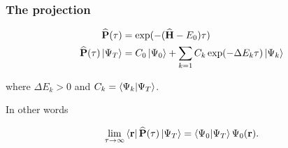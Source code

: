 \begin{frame}
\frametitle{The projection}
  \begin{align*}
  {\bf\widehat{P}}(\tau) &= \exp(-({\bf\widehat{H}} - E_0)\tau) \\
  {\bf\widehat{P}}(\tau)\left| \Psi_T \right> &= C_0\left| \Psi_0 \right> + \sum_{k=1} C_k\exp(-\Delta E_k\tau) \left| \Psi_k \right>
  \end{align*}

  where $\Delta E_k > 0$ and $C_k = \left\langle \Psi_k | \Psi_T\right\rangle$. 
  
  \pause 
  
   In other words
 
 \begin{equation*}
  \lim_{\tau\to\infty}\left< \mathbf{r} \right|{\bf\widehat{P}}(\tau)\left| \Psi_T \right> = \left\langle \Psi_0 | \Psi_T\right\rangle\Psi_0(\mathbf{r}).
 \end{equation*}

\end{frame}

